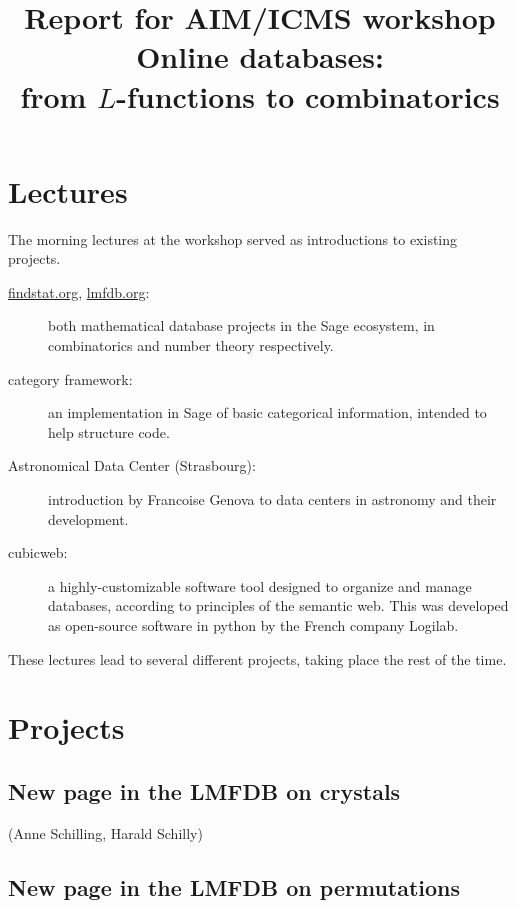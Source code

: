 \documentclass{article}
\begin{document}
\title{Report for AIM/ICMS workshop\\Online databases: \\from $L$-functions to combinatorics}
\maketitle

\section{Lectures}
The morning lectures at the workshop served as introductions to existing projects.
\begin{description}
\item[\url{findstat.org}, \url{lmfdb.org}:] both mathematical database projects in the Sage ecosystem, in combinatorics and number theory respectively. 
\item[\textsf{category} framework:] an implementation in Sage of basic categorical information, intended to help structure code.
\item[Astronomical Data Center (Strasbourg):] introduction by Francoise Genova to data centers in astronomy and their development.
\item[\textsf{cubicweb}:] a highly-customizable software tool designed to organize and manage databases, according to principles of the semantic web. This was developed as open-source software in \textsf{python} by the French company Logilab.
\end{description} 

These lectures lead to several different projects, taking place the rest of the time. 
\section{Projects}


\subsection{New page in the LMFDB on crystals}

(Anne Schilling, Harald Schilly)


\subsection{New page in the LMFDB on permutations}
\end{document}
